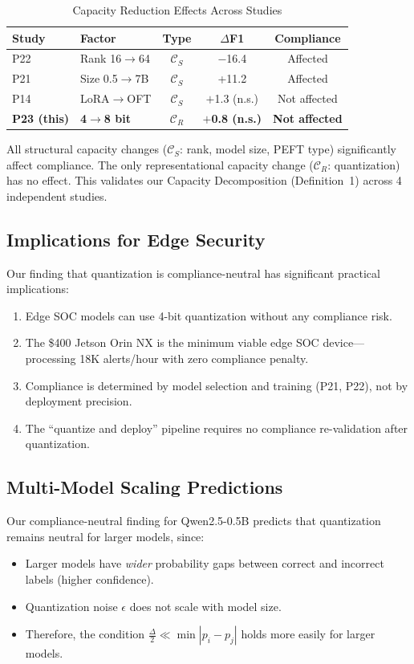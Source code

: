 \documentclass[journal]{IEEEtran}
\begin{document}
\begin{table}[!ht]
\centering\caption{Capacity Reduction Effects Across Studies}
\label{tab:cross}
\begin{tabular}{llccc}
\toprule
\textbf{Study} & \textbf{Factor} & \textbf{Type} & \textbf{$\Delta$F1} & \textbf{Compliance} \\
\midrule
P22~\cite{p22} & Rank 16$\to$64 & $\mathcal{C}_S$ & $-$16.4 & Affected \\
P21~\cite{p21} & Size 0.5$\to$7B & $\mathcal{C}_S$ & +11.2 & Affected \\
P14~\cite{p14} & LoRA$\to$OFT & $\mathcal{C}_S$ & $+$1.3 (n.s.) & Not affected \\
\textbf{P23 (this)} & \textbf{4$\to$8 bit} & $\mathcal{C}_R$ & \textbf{$+$0.8 (n.s.)} & \textbf{Not affected} \\
\bottomrule
\end{tabular}
\end{table}

All structural capacity changes ($\mathcal{C}_S$: rank, model size, PEFT type) significantly affect compliance. The only representational capacity change ($\mathcal{C}_R$: quantization) has no effect. This validates our Capacity Decomposition (Definition~1) across 4 independent studies.

\subsection{Implications for Edge Security}
Our finding that quantization is compliance-neutral has significant practical implications:
\begin{enumerate}
\item Edge SOC models can use 4-bit quantization without any compliance risk.
\item The \$400 Jetson Orin NX is the minimum viable edge SOC device---processing 18K alerts/hour with zero compliance penalty.
\item Compliance is determined by model selection and training (P21, P22), not by deployment precision.
\item The ``quantize and deploy'' pipeline requires no compliance re-validation after quantization.
\end{enumerate}

\subsection{Multi-Model Scaling Predictions}
Our compliance-neutral finding for Qwen2.5-0.5B predicts that quantization remains neutral for larger models, since:
\begin{itemize}
\item Larger models have \emph{wider} probability gaps between correct and incorrect labels (higher confidence).
\item Quantization noise $\epsilon$ does not scale with model size.
\item Therefore, the condition $\frac{\Delta}{2} \ll \min|p_i - p_j|$ holds more easily for larger models.
\end{itemize}
\end{document}
